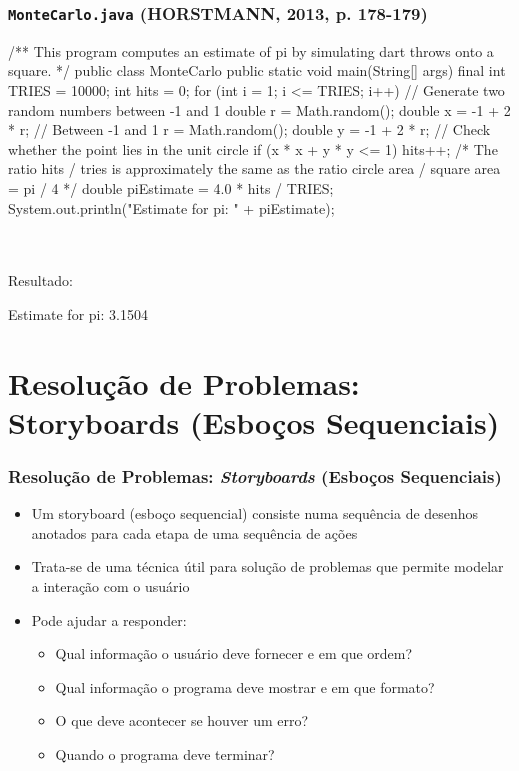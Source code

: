 \documentclass[xcolor={dvipsnames,table},aspectratio=169]{beamer}
\begin{document}
\begin{frame}[fragile]\frametitle{\texttt{MonteCarlo.java} {\tiny (HORSTMANN, 2013, p. 178-179)}}
{\tiny
\begin{javacode}
/**
   This program computes an estimate of pi by simulating dart throws onto a square.
*/
public class MonteCarlo {
   public static void main(String[] args) {
      final int TRIES = 10000;
      int hits = 0;
      for (int i = 1; i <= TRIES; i++) {
         // Generate two random numbers between -1 and 1
         double r = Math.random();
         double x = -1 + 2 * r; // Between -1 and 1
         r = Math.random();
         double y = -1 + 2 * r;
         // Check whether the point lies in the unit circle
         if (x * x + y * y <= 1) { hits++; }
      }
      /* The ratio hits / tries is approximately the same as the ratio
         circle area / square area = pi / 4  */
      double piEstimate = 4.0 * hits / TRIES;
      System.out.println("Estimate for pi: " + piEstimate);
   }
}
\end{javacode}
~\\
~\\
Resultado:\\
\begin{javacode}
Estimate for pi: 3.1504
\end{javacode}
}
\end{frame}

\section{Resolução de Problemas: Storyboards (Esboços Sequenciais)}

\begin{frame}\frametitle{Resolução de Problemas: \emph{Storyboards} (Esboços Sequenciais)}
\begin{itemize}
	\item Um storyboard (esboço sequencial) consiste numa sequência de desenhos anotados para cada etapa de uma sequência de ações
	\item Trata-se de uma técnica útil para solução de problemas que permite modelar a interação com o usuário
	\item Pode ajudar a responder:
	\begin{itemize}
		\item Qual informação o usuário deve fornecer e em que ordem?
		\item Qual informação o programa deve mostrar e em que formato?
		\item O que deve acontecer se houver um erro?
		\item Quando o programa deve terminar?
	\end{itemize}
\end{itemize}
\end{frame}
\end{document}
